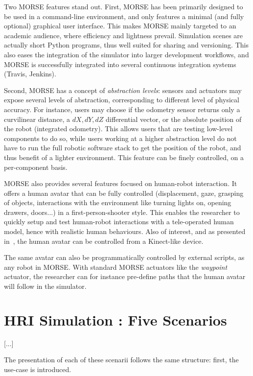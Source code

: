 \documentclass[conference]{IEEEtran}
\begin{document}
Two MORSE features stand out. First, MORSE has been primarily designed to be
used in a command-line environment, and only features a minimal (and fully
optional) graphical user interface. This makes MORSE mainly targeted to an
academic audience, where efficiency and lightness prevail.  Simulation scenes
are actually short Python programs, thus well suited for sharing and versioning.
This also eases the integration of the simulator into larger development
workflows, and MORSE is successfully integrated into several continuous
integration systems (Travis, Jenkins).

Second, MORSE has a concept of \emph{abstraction levels}: sensors and actuators may
expose several levels of abstraction, corresponding to different level of
physical accuracy. For instance, users may choose if the odometry sensor returns
only a curvilinear distance, a $dX, dY, dZ$ differential vector, or the absolute
position of the robot (integrated odometry). This allows users that are testing
low-level components to do so, while users working at a higher abstraction level
do not have to run the full robotic software stack to get the position of the
robot, and thus benefit of a lighter environment. This feature can be finely
controlled, on a per-component basis.

MORSE also provides several features focused on human-robot interaction. It
offers a human avatar that can be fully controlled (displacement, gaze, grasping
of objects, interactions with the environment like turning lights on, opening
drawers, doors...) in a first-person-shooter style. This enables the researcher
to quickly setup and test human-robot interactions with a tele-operated human
model, hence with realistic human behaviours. Also of interest, and as presented
in~\cite{lemaignan2012morse}, the human avatar can be controlled from a
Kinect-like device.

The same avatar can also be programmatically controlled by external scripts, as
any robot in MORSE. With standard MORSE actuators like the \emph{waypoint} actuator,
the researcher can for instance pre-define paths that the human avatar will
follow in the simulator.



\section{HRI Simulation : Five Scenarios}

[...]

The presentation of each of these scenarii follows the same structure: first,
the use-case is introduced.
\end{document}
